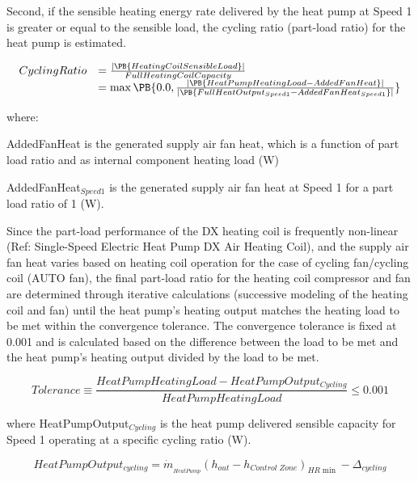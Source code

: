 Second, if the sensible heating energy rate delivered by the heat pump at Speed 1 is greater or equal to the sensible load, the cycling ratio (part-load ratio) for the heat pump is estimated.

\begin{equation}
  \begin{array}{rl}
    CyclingRatio &= \frac{\left|\PB{HeatingCoilSensibleLoad}\right|}{FullHeatingCoilCapacity} \\
                 &= \max \PB{0.0, \frac{\left|\PB{HeatPumpHeatingLoad-AddedFanHeat}\right|}{\left|\PB{FullHeatOutput_{Speed1}-AddedFanHeat_{Speed1}}\right|} }
  \end{array}
\label{eq:UnitaryMultiSpeedCyclingRatioHeating}
\end{equation}

where:

AddedFanHeat is the generated supply air fan heat, which is a function of part load ratio and as internal component heating load (W)

AddedFanHeat\(_{Speed1}\) is the generated supply air fan heat at Speed 1 for a part load ratio of 1 (W).

Since the part-load performance of the DX heating coil is frequently non-linear (Ref: Single-Speed Electric Heat Pump DX Air Heating Coil), and the supply air fan heat varies based on heating coil operation for the case of cycling fan/cycling coil (AUTO fan), the final part-load ratio for the heating coil compressor and fan are determined through iterative calculations (successive modeling of the heating coil and fan) until the heat pump's heating output matches the heating load to be met within the convergence tolerance. The convergence tolerance is fixed at 0.001 and is calculated based on the difference between the load to be met and the heat pump's heating output divided by the load to be met.

\begin{equation}
  Tolerance \equiv \frac{HeatPumpHeatingLoad - HeatPumpOutput_{Cycling}}{HeatPumpHeatingLoad} \leq 0.001
\end{equation}

where HeatPumpOutput\(_{Cycling}\) is the heat pump delivered sensible capacity for Speed 1 operating at a specific cycling ratio (W).

\begin{equation}
HeatPumpOutpu{t_{cycling}} = {\dot m_{_{HeatPump}}}{\left( {{h_{out}} - {h_{Control\;Zone}}} \right)_{HR\min }} - {\Delta_{cycling}}
\end{equation}


